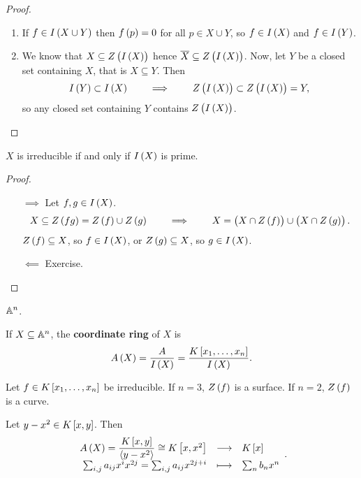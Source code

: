 \begin{proof}
\hfill
\begin{enumerate}
\item If $ f \in I\br{X \cup Y} $ then $ f\br{p} = 0 $ for all $ p \in X \cup Y $, so $ f \in I\br{X} $ and $ f \in I\br{Y} $.
\item We know that $ X \subseteq Z\br{I\br{X}} $ hence $ \overline{X} \subseteq Z\br{I\br{X}} $. Now, let $ Y $ be a closed set containing $ X $, that is $ X \subseteq Y $. Then
$$ I\br{Y} \subset I\br{X} \qquad \implies \qquad Z\br{I\br{X}} \subset Z\br{I\br{X}} = Y, $$
so any closed set containing $ Y $ contains $ Z\br{I\br{X}} $.
\end{enumerate}
\end{proof}

\begin{proposition}
$ X $ is irreducible if and only if $ I\br{X} $ is prime.
\end{proposition}

\begin{proof}
\hfill
\begin{itemize}
\item[$ \implies $] Let $ f, g \in I\br{X} $.
$$ X \subseteq Z\br{fg} = Z\br{f} \cup Z\br{g} \qquad \implies \qquad X = \br{X \cap Z\br{f}} \cup \br{X \cap Z\br{g}}. $$
$ Z\br{f} \subseteq X $, so $ f \in I\br{X} $, or $ Z\br{g} \subseteq X $, so $ g \in I\br{X} $.
\item[$ \impliedby $] Exercise.
\end{itemize}
\end{proof}

\begin{example}
$ \mathbb{A}^n $.
\end{example}

\begin{definition}
If $ X \subseteq \mathbb{A}^n $, the \textbf{coordinate ring} of $ X $ is
$$ A\br{X} = \dfrac{A}{I\br{X}} = \dfrac{K\sbr{x_1, \dots, x_n}}{I\br{X}}. $$
\end{definition}


\begin{example}
Let $ f \in K\sbr{x_1, \dots, x_n} $ be irreducible. If $ n = 3 $, $ Z\br{f} $ is a surface. If $ n = 2 $, $ Z\br{f} $ is a curve.
\end{example}

\begin{example}
Let $ y - x^2 \in K\sbr{x, y} $. Then
$$ \function{A\br{X} = \dfrac{K\sbr{x, y}}{\abr{y - x^2}} \cong K\sbr{x, x^2}}{K\sbr{x}}{\sum_{i, j} a_{ij}x^ix^{2j} = \sum_{i, j} a_{ij}x^{2j + i}}{\sum_n b_nx^n}. $$
\end{example}

